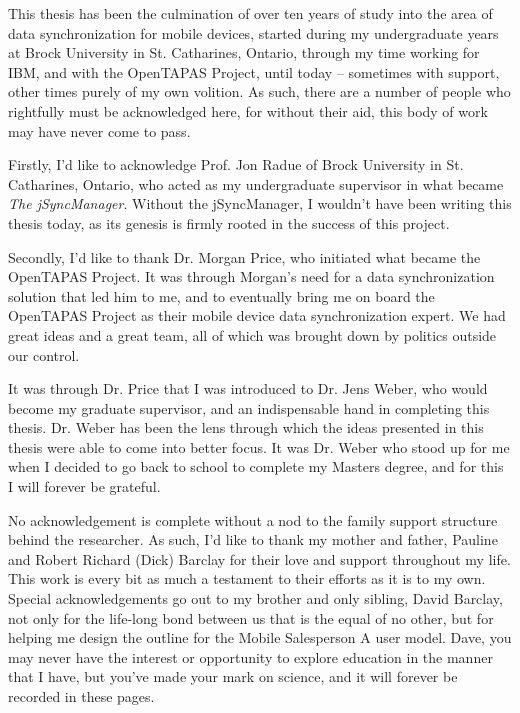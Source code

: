 
\begin{acknowledge}[\normalfont\large\bfseries]

This thesis has been the culmination of over ten years of study into the area of data synchronization for mobile devices, started during my undergraduate years at Brock University in St. Catharines, Ontario, through my time working for IBM, and with the OpenTAPAS Project, until today -- sometimes with support, other times purely of my own volition.  As such, there are a number of people who rightfully must be acknowledged here, for without their aid, this body of work may have never come to pass.

Firstly, I'd like to acknowledge Prof. Jon Radue of Brock University in St. Catharines, Ontario, who acted as my undergraduate supervisor in what became \emph{The jSyncManager}.  Without the jSyncManager, I wouldn't have been writing this thesis today, as its genesis is firmly rooted in the success of this project.

Secondly, I'd like to thank Dr. Morgan Price, who initiated what became the OpenTAPAS Project.  It was through Morgan's need for a data synchronization solution that led him to me, and to eventually bring me on board the OpenTAPAS Project as their mobile device data synchronization expert.  We had great ideas and a great team, all of which was brought down by politics outside our control.

It was through Dr. Price that I was introduced to Dr. Jens Weber, who would become my graduate supervisor, and an indispensable hand in completing this thesis.  Dr. Weber has been the lens through which the ideas presented in this thesis were able to come into better focus.  It was Dr. Weber who stood up for me when I decided to go back to school to complete my Masters degree, and for this I will forever be grateful.

No acknowledgement is complete without a nod to the family support structure behind the researcher.  As such, I'd like to thank my mother and father, Pauline and Robert Richard (Dick) Barclay for their love and support throughout my life.  This work is every bit as much a testament to their efforts as it is to my own.  Special acknowledgements go out to my brother and only sibling, David Barclay, not only for the life-long bond between us that is the equal of no other, but for helping me design the outline for the Mobile Salesperson A user model.  Dave, you may never have the interest or opportunity to explore education in the manner that I have, but you've made your mark on science, and it will forever be recorded in these pages.


\end{acknowledge}
